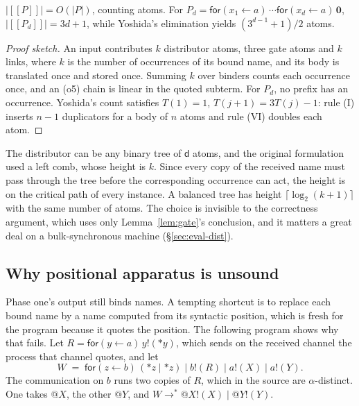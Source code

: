 \documentclass[acmsmall,screen,review,anonymous]{acmart}
\makeatletter
\newcommand{\quo}[1]{@#1}
\newcommand{\drp}[1]{{*}#1}
\newcommand{\inp}[3]{\mathsf{for}(#1 \leftarrow #2)\,#3}
\newcommand{\out}[2]{#1!(#2)}
\newcommand{\nil}{\mathbf{0}}
\newcommand{\enc}[1]{[\![#1]\!]}
\newcommand{\wred}{\longrightarrow^{*}}
\newcommand{\dd}{\mathsf{d}}
\makeatother
\begin{document}
\begin{proposition}[Size]
\label{prop:linear}
$|\enc{P}| = O(|P|)$, counting atoms. For
$P_{d} = \inp{x_{1}}{a}{\cdots \inp{x_{d}}{a}{\nil}}$,
$|\enc{P_{d}}| = 3d+1$, while Yoshida's elimination yields $(3^{d-1}+1)/2$
atoms.
\end{proposition}

\begin{proof}[Proof sketch]
An input contributes $k$ distributor atoms, three gate atoms and $k$ links,
where $k$ is the number of occurrences of its bound name, and its body is
translated once and stored once. Summing $k$ over binders counts each
occurrence once, and an (o5) chain is linear in the quoted subterm. For
$P_{d}$, no prefix has an occurrence. Yoshida's count satisfies $T(1)=1$,
$T(j+1) = 3T(j) - 1$: rule (I) inserts $n-1$ duplicators for a body of $n$
atoms and rule (VI) doubles each atom.
\end{proof}

The distributor can be any binary tree of $\dd$ atoms, and the original
formulation used a left comb, whose height is $k$. Since every copy of the
received name must pass through the tree before the corresponding occurrence
can act, the height is on the critical path of every instance. A balanced
tree has height $\lceil \log_{2}(k+1) \rceil$ with the same number of atoms.
The choice is invisible to the correctness argument, which uses only
Lemma~\ref{lem:gate}'s conclusion, and it matters a great deal on a
bulk-synchronous machine (\S\ref{sec:eval-dist}).

\subsection{Why positional apparatus is unsound}
\label{sec:positional}

Phase one's output still binds names. A tempting shortcut is to replace each
bound name by a name computed from its syntactic position, which is fresh for
the program because it quotes the position. The following program shows why
that fails. Let $R = \inp{y}{a}{\out{y}{\drp{y}}}$, which sends on the received
channel the process that channel quotes, and let
\[
  W \;=\; \inp{z}{b}{(\drp{z} \mid \drp{z})} \mid \out{b}{R}
      \mid \out{a}{X} \mid \out{a}{Y} .
\]
The communication on $b$ runs two copies of $R$, which in the source are
$\alpha$-distinct. One takes $\quo{X}$, the other $\quo{Y}$, and
$W \wred \out{\quo{X}}{X} \mid \out{\quo{Y}}{Y}$.
\end{document}
